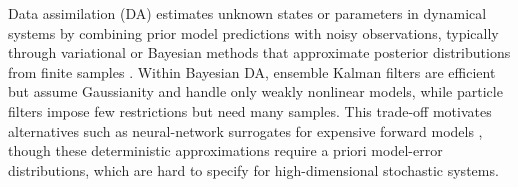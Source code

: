 

Data assimilation (DA) estimates unknown states or parameters in dynamical systems by combining prior model predictions with noisy observations, typically through variational or Bayesian methods that approximate posterior distributions from finite samples \cite{evensen_data_2022}. Within Bayesian DA, ensemble Kalman filters are efficient but assume Gaussianity and handle only weakly nonlinear models, while particle filters impose few restrictions but need many samples. This trade-off motivates alternatives such as neural-network surrogates for expensive forward models \cite{mucke_deep_2024, cheng_generalised_2022, zhong_reduced-order_2023, chen_reduced-order_2023}, though these deterministic approximations require a priori model-error distributions, which are hard to specify for high-dimensional stochastic systems.

